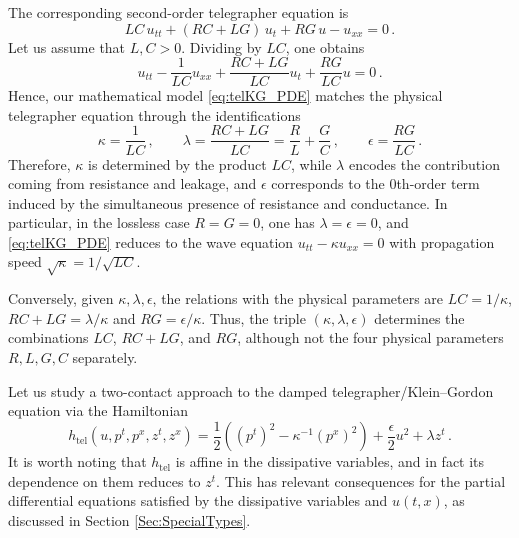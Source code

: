 \documentclass[11pt,twoside]{article}
\theoremstyle{plain}
\theoremstyle{definition}
\theoremstyle{remark}
\begin{document}
The corresponding second-order telegrapher equation is
\begin{equation}\label{eq:physical_telegrapher}
LC\,u_{tt}+(RC+LG)\,u_t+RG\,u-u_{xx}=0 \,.
\end{equation}
Let us assume that $L,C>0$. 
Dividing by \(LC\), one obtains
\begin{equation}\label{eq:physical_telegrapher_normalized}
u_{tt}-\frac{1}{LC}u_{xx}+\frac{RC+LG}{LC}u_t+\frac{RG}{LC}u=0 \,.
\end{equation}
Hence, our mathematical model \eqref{eq:telKG_PDE} matches the physical telegrapher equation through the identifications
\begin{equation}\label{eq:parameter_identification}
\kappa=\frac{1}{LC}\,,\qquad \lambda=\frac{RC+LG}{LC}=\frac{R}{L}+\frac{G}{C}\,,\qquad \epsilon=\frac{RG}{LC}\,.
\end{equation}
Therefore, \(\kappa\) is determined by the product \(LC\), while \(\lambda\) encodes the  contribution coming from resistance and leakage, and \(\epsilon\) corresponds to the 0th-order term induced by the simultaneous presence of resistance and conductance. In particular, in the lossless case \(R=G=0\), one has \(\lambda=\epsilon=0\), and \eqref{eq:telKG_PDE} reduces to the wave equation \(u_{tt}-\kappa u_{xx}=0\) with propagation speed \(\sqrt{\kappa}=1/\sqrt{LC}\).

Conversely, given \(\kappa,\lambda,\epsilon\), the relations with the physical parameters are
$LC = 1/\kappa$, $RC+LG = \lambda/\kappa$ and $RG = \epsilon/\kappa$.
Thus, the triple \((\kappa,\lambda,\epsilon)\) determines the combinations \(LC\), \(RC+LG\), and \(RG\), although not the four physical parameters \(R,L,G,C\) separately.

Let us study a two-contact approach to the damped telegrapher/Klein--Gordon equation via the Hamiltonian
\begin{equation}\label{eq:telKG_ham}
h_{\mathrm{tel}}(u,p^t,p^x,z^t,z^x)
=
\frac12\left((p^t)^2-\kappa^{-1}(p^x)^2\right)
+\frac{\epsilon}{2}u^2+\lambda z^t\,.
\end{equation}
It is worth noting that \(h_{\mathrm{tel}}\) is affine in the dissipative variables, and in fact its dependence on them reduces  to \(z^t\). This has relevant consequences for the partial differential equations satisfied by the dissipative variables and $u(t,x)$, as discussed in Section \ref{Sec:SpecialTypes}.
\end{document}
